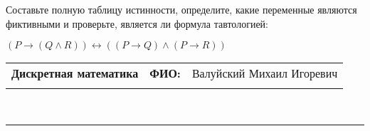 \documentclass[10pt]{exam}
\newcommand{\class}{Дискретная математика}
\newcommand{\examdate}{}
\begin{document}
\begin{questions}
\begin{enumerate} [a)]
\end{enumerate}\question Составьте полную таблицу истинности, определите, какие переменные являются фиктивными и проверьте, является ли формула тавтологией:

$(P \rightarrow (Q \land R)) \leftrightarrow ((P \rightarrow Q) \land (P \rightarrow R))$

\end{questions}
\newpage
\begin{flushright}
\begin{tabular}{p{2.8in} r l}
\textbf{\class} & \textbf{ФИО:} &Валуйский Михаил Игоревич
\\

\textbf{\examdate} &&\\
\end{tabular}\\
\end{flushright}
\rule[1ex]{\textwidth}{.1pt}
\end{document}
